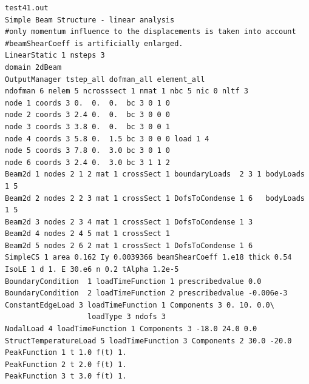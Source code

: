 \documentclass[a4paper]{article}
\begin{document}
{\small\begin{verbatim}
test41.out
Simple Beam Structure - linear analysis
#only momentum influence to the displacements is taken into account
#beamShearCoeff is artificially enlarged.
LinearStatic 1 nsteps 3
domain 2dBeam
OutputManager tstep_all dofman_all element_all
ndofman 6 nelem 5 ncrosssect 1 nmat 1 nbc 5 nic 0 nltf 3
node 1 coords 3 0.  0.  0.  bc 3 0 1 0
node 2 coords 3 2.4 0.  0.  bc 3 0 0 0
node 3 coords 3 3.8 0.  0.  bc 3 0 0 1
node 4 coords 3 5.8 0.  1.5 bc 3 0 0 0 load 1 4
node 5 coords 3 7.8 0.  3.0 bc 3 0 1 0
node 6 coords 3 2.4 0.  3.0 bc 3 1 1 2
Beam2d 1 nodes 2 1 2 mat 1 crossSect 1 boundaryLoads  2 3 1 bodyLoads 1 5
Beam2d 2 nodes 2 2 3 mat 1 crossSect 1 DofsToCondense 1 6   bodyLoads 1 5
Beam2d 3 nodes 2 3 4 mat 1 crossSect 1 DofsToCondense 1 3 
Beam2d 4 nodes 2 4 5 mat 1 crossSect 1 
Beam2d 5 nodes 2 6 2 mat 1 crossSect 1 DofsToCondense 1 6 
SimpleCS 1 area 0.162 Iy 0.0039366 beamShearCoeff 1.e18 thick 0.54 
IsoLE 1 d 1. E 30.e6 n 0.2 tAlpha 1.2e-5
BoundaryCondition  1 loadTimeFunction 1 prescribedvalue 0.0 	
BoundaryCondition  2 loadTimeFunction 2 prescribedvalue -0.006e-3 	
ConstantEdgeLoad 3 loadTimeFunction 1 Components 3 0. 10. 0.0\
                   loadType 3 ndofs 3
NodalLoad 4 loadTimeFunction 1 Components 3 -18.0 24.0 0.0
StructTemperatureLoad 5 loadTimeFunction 3 Components 2 30.0 -20.0
PeakFunction 1 t 1.0 f(t) 1.
PeakFunction 2 t 2.0 f(t) 1.
PeakFunction 3 t 3.0 f(t) 1.
\end{verbatim}}
\end{document}
